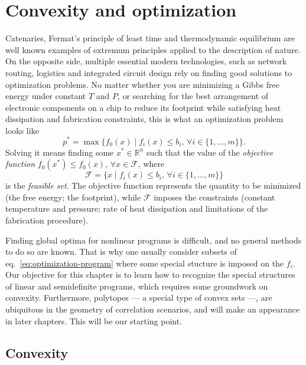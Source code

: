 \chapter{Convexity and optimization}
\thispagestyle{empty}  %

	Catenaries, Fermat's principle of least time and thermodynamic equilibrium are well known examples of extremum principles applied to the description of nature. On the opposite side, multiple essential modern technologies, such as network routing, logistics and integrated circuit design rely on finding good solutions to optimization problems. No matter whether you are minimizing a Gibbs free energy under constant $T$ and $P$, or searching for the best arrangement of electronic components on a chip to reduce its footprint while satisfying heat dissipation and fabrication constraints, this is what an optimization problem looks like
	\begin{equation}
		p^* = \max \big\{ f_0(x) \mid f_i(x) \leq b_i, \,\forall i \in \{1, \ldots, m\} \big\} .
		\label{eq:optimization-program}
	\end{equation}
	Solving it means finding some $x^* \in \mathbb{R}^n$ such that the value of the \emph{objective function} $f_0(x^*) \leq f_0(x), \,\forall x \in \mathcal{F}$, where
	$$
	\mathcal{F} = \big\{ x \mid f_i(x) \leq b_i , \,\forall i \in \{1, \ldots, m\} \big\}
	$$
	is the \emph{feasible set}. The objective function represents the quantity to be minimized (the free energy; the footprint), while $\mathcal{F}$ imposes the constraints (constant temperature and pressure; rate of heat dissipation and limitations of the fabrication procedure).
	
	Finding global optima for nonlinear programs is difficult, and no general methods to do so are known. That is why one usually consider subsets of eq.~\ref{eq:optimization-program} where some special stucture is imposed on the $f_i$. Our objective for this chapter is to learn how to recognize the special structures of linear and semidefinite programs, which requires some groundwork on convexity. Furthermore, polytopes --- a special type of convex sets ---, are ubiquitous in the geometry of correlation scenarios, and will make an appearance in later chapters. This will be our starting point.	


	\section{Convexity}
	\label{sec:convexity}

